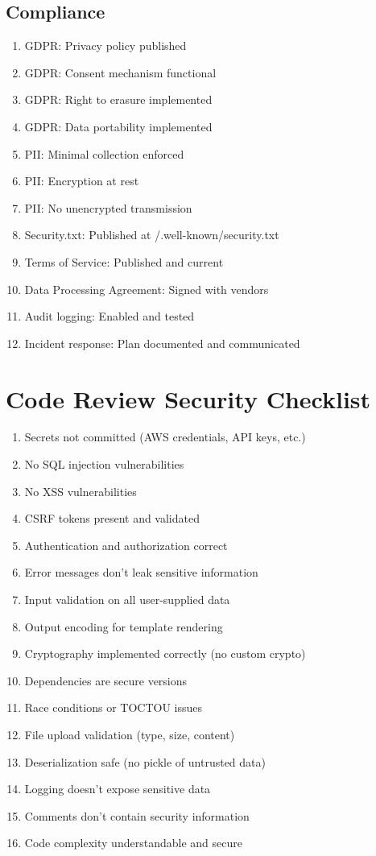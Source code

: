 \documentclass{report}
\begin{document}
\subsection{Compliance}
\begin{enumerate}
\item GDPR: Privacy policy published
\item GDPR: Consent mechanism functional
\item GDPR: Right to erasure implemented
\item GDPR: Data portability implemented
\item PII: Minimal collection enforced
\item PII: Encryption at rest
\item PII: No unencrypted transmission
\item Security.txt: Published at /.well-known/security.txt
\item Terms of Service: Published and current
\item Data Processing Agreement: Signed with vendors
\item Audit logging: Enabled and tested
\item Incident response: Plan documented and communicated
\end{enumerate}

\section{Code Review Security Checklist}

\begin{enumerate}
\item Secrets not committed (AWS credentials, API keys, etc.)
\item No SQL injection vulnerabilities
\item No XSS vulnerabilities
\item CSRF tokens present and validated
\item Authentication and authorization correct
\item Error messages don't leak sensitive information
\item Input validation on all user-supplied data
\item Output encoding for template rendering
\item Cryptography implemented correctly (no custom crypto)
\item Dependencies are secure versions
\item Race conditions or TOCTOU issues
\item File upload validation (type, size, content)
\item Deserialization safe (no pickle of untrusted data)
\item Logging doesn't expose sensitive data
\item Comments don't contain security information
\item Code complexity understandable and secure
\end{enumerate}
\end{document}
